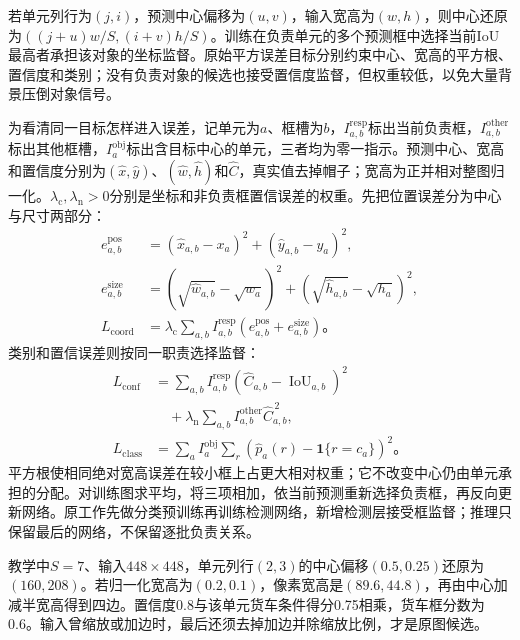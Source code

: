 若单元列行为$(j,i)$，预测中心偏移为$(u,v)$，输入宽高为$(w,h)$，则中心还原为$((j+u)w/S,(i+v)h/S)$。训练在负责单元的多个预测框中选择当前IoU最高者承担该对象的坐标监督。原始平方误差目标分别约束中心、宽高的平方根、置信度和类别；没有负责对象的候选也接受置信度监督，但权重较低，以免大量背景压倒对象信号。

为看清同一目标怎样进入误差，记单元为$a$、框槽为$b$，$I^{\mathrm{resp}}_{a,b}$标出当前负责框，$I^{\mathrm{other}}_{a,b}$标出其他框槽，$I^{\mathrm{obj}}_a$标出含目标中心的单元，三者均为零一指示。预测中心、宽高和置信度分别为$(\hat x,\hat y)$、$(\hat w,\hat h)$和$\hat C$，真实值去掉帽子；宽高为正并相对整图归一化。$\lambda_{\mathrm c},\lambda_{\mathrm n}>0$分别是坐标和非负责框置信误差的权重。先把位置误差分为中心与尺寸两部分：
\begin{equation}
 \begin{aligned}
 e_{a,b}^{\mathrm{pos}}&=(\hat x_{a,b}-x_a)^2
                       +(\hat y_{a,b}-y_a)^2,\\
 e_{a,b}^{\mathrm{size}}&=(\sqrt{\hat w_{a,b}}-\sqrt{w_a})^2
                        +(\sqrt{\hat h_{a,b}}-\sqrt{h_a})^2,\\
 L_{\mathrm{coord}}&=\lambda_{\mathrm c}\sum_{a,b}
 I^{\mathrm{resp}}_{a,b}(e_{a,b}^{\mathrm{pos}}+e_{a,b}^{\mathrm{size}})\text{。}
 \end{aligned}
 \label{eq:vision-yolo-training-process}
\end{equation}
类别和置信误差则按同一职责选择监督：
\[
 \begin{aligned}
 L_{\mathrm{conf}}&=\sum_{a,b}I^{\mathrm{resp}}_{a,b}
 (\hat C_{a,b}-\operatorname{IoU}_{a,b})^2\\
 &\quad+\lambda_{\mathrm n}\sum_{a,b}
 I^{\mathrm{other}}_{a,b}\hat C_{a,b}^{\,2},\\
 L_{\mathrm{class}}&=\sum_a I^{\mathrm{obj}}_a\sum_r
 (\hat p_a(r)-\mathbf{1}\{r=c_a\})^2\text{。}
 \end{aligned}
\]
平方根使相同绝对宽高误差在较小框上占更大相对权重；它不改变中心仍由单元承担的分配。对训练图求平均，将三项相加，依当前预测重新选择负责框，再反向更新网络。原工作先做分类预训练再训练检测网络，新增检测层接受框监督；推理只保留最后的网络，不保留逐批负责关系。

教学中$S=7$、输入$448\times448$，单元列行$(2,3)$的中心偏移$(0.5,0.25)$还原为$(160,208)$。若归一化宽高为$(0.2,0.1)$，像素宽高是$(89.6,44.8)$，再由中心加减半宽高得到四边。置信度0.8与该单元货车条件得分0.75相乘，货车框分数为0.6。输入曾缩放或加边时，最后还须去掉加边并除缩放比例，才是原图候选。

